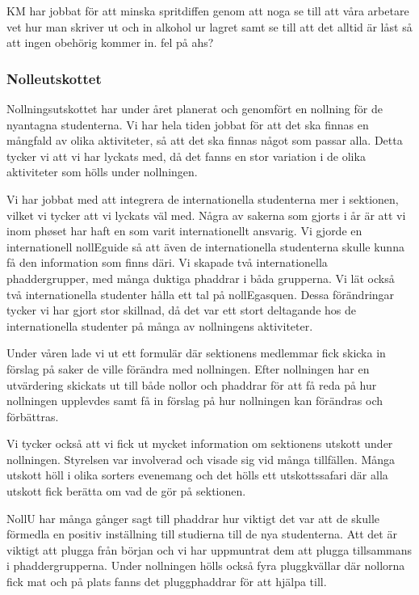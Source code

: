 \documentclass[../_main/handlingar.tex]{subfiles}
\begin{document}
KM har jobbat för att minska spritdiffen genom att noga se till att våra arbetare vet hur man skriver ut och in alkohol ur lagret samt se till att det alltid är låst så att ingen obehörig kommer in. fel på ahs?

\subsubsection*{Nolleutskottet}
Nollningsutskottet har under året planerat och genomfört en nollning för de nyantagna studenterna. Vi har hela tiden jobbat för att det ska finnas en mångfald av olika aktiviteter, så att det ska finnas något som passar alla. Detta tycker vi att vi har lyckats med, då det fanns en stor variation i de olika aktiviteter som hölls under nollningen. 

Vi har jobbat med att integrera de internationella studenterna mer i sektionen, vilket vi tycker att vi lyckats väl med. Några av sakerna som gjorts i år är att vi inom phøset har haft en som varit internationellt ansvarig. Vi gjorde en internationell nollEguide så att även de internationella studenterna skulle kunna få den information som finns däri. Vi skapade två internationella phaddergrupper, med många duktiga phaddrar i båda grupperna. Vi lät också två internationella studenter hålla ett tal på nollEgasquen. Dessa förändringar tycker vi har gjort stor skillnad, då det var ett stort deltagande hos de internationella studenter på många av nollningens aktiviteter.

Under våren lade vi ut ett formulär där sektionens medlemmar fick skicka in förslag på saker de ville förändra med nollningen. Efter nollningen har en utvärdering skickats ut till både nollor och phaddrar för att få reda på hur nollningen upplevdes samt få in förslag på hur nollningen kan förändras och förbättras. 

Vi tycker också att vi fick ut mycket information om sektionens utskott under nollningen. Styrelsen var involverad och visade sig vid många tillfällen. Många utskott höll i olika sorters evenemang och det hölls ett utskottssafari där alla utskott fick berätta om vad de gör på sektionen.

NollU har många gånger sagt till phaddrar hur viktigt det var att de skulle förmedla en positiv inställning till studierna till de nya studenterna. Att det är viktigt att plugga från början och vi har uppmuntrat dem att plugga tillsammans i phaddergrupperna. Under nollningen hölls också fyra pluggkvällar där nollorna fick mat och på plats fanns det pluggphaddrar för att hjälpa till.
\end{document}
